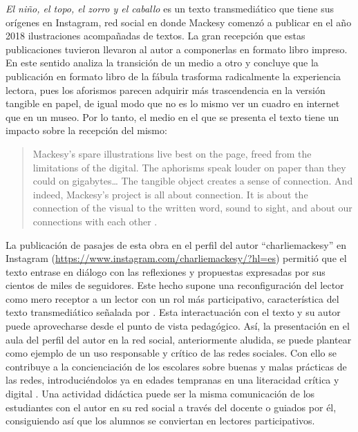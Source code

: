 \documentclass[spanish]{textolivre}
\begin{document}
\textit{El niño, el topo, el zorro y el caballo} es un texto transmediático que tiene sus orígenes en Instagram, red social en donde Mackesy comenzó a publicar en el año 2018 ilustraciones acompañadas de textos. La gran recepción que estas publicaciones tuvieron llevaron al autor a componerlas en formato libro impreso. En este sentido \textcite{greenwood_boy_2020} analiza la transición de un medio a otro y concluye que la publicación en formato libro de la fábula trasforma radicalmente la experiencia lectora, pues los aforismos parecen adquirir más trascendencia en la versión tangible en papel, de igual modo que no es lo mismo ver un cuadro en internet que en un museo. Por lo tanto, el medio en el que se presenta el texto tiene un impacto sobre la recepción del mismo:

\begin{quote}
    Mackesy’s spare illustrations live best on the page, freed from the limitations of the digital. The aphorisms speak louder on paper than they could on gigabytes… The tangible object creates a sense of connection. And indeed, Mackesy’s project is all about connection. It is about the connection of the visual to the written word, sound to sight, and about our connections with each other \cite[s.p.]{greenwood_boy_2020}.
\end{quote}

La publicación de pasajes de esta obra en el perfil del autor “charliemackesy” en Instagram (\url{https://www.instagram.com/charliemackesy/?hl=es}) permitió que el texto entrase en diálogo con las reflexiones y propuestas expresadas por sus cientos de miles de seguidores. Este hecho supone una reconfiguración del lector como mero receptor a un lector con un rol más participativo, característica del texto transmediático señalada por \textcite{scolari_narrativas_2014}. Esta interactuación con el texto y su autor puede aprovecharse desde el punto de vista pedagógico. Así, la presentación en el aula del perfil del autor en la red social, anteriormente aludida, se puede plantear como ejemplo de un uso responsable y crítico de las redes sociales. Con ello se contribuye a la concienciación de los escolares sobre buenas y malas prácticas de las redes, introduciéndolos ya en edades tempranas en una literacidad crítica y digital \cite{cassany_aproximacion_2010}. Una actividad didáctica puede ser la misma comunicación de los estudiantes con el autor en su red social a través del docente o guiados por él, consiguiendo así que los alumnos se conviertan en lectores participativos.
\end{document}
